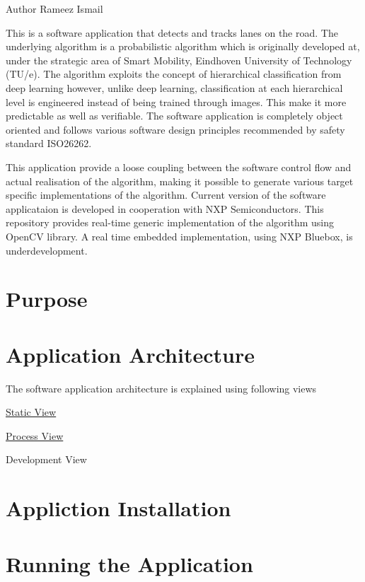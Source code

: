 \begin{DoxyAuthor}{Author}
Rameez Ismail
\end{DoxyAuthor}
This is a software application that detects and tracks lanes on the road. The underlying algorithm is a probabilistic algorithm which is originally developed at, under the strategic area of Smart Mobility, Eindhoven University of Technology (T\-U/e). The algorithm exploits the concept of hierarchical classification from deep learning however, unlike deep learning, classification at each hierarchical level is engineered instead of being trained through images. This make it more predictable as well as verifiable. The software application is completely object oriented and follows various software design principles recommended by safety standard I\-S\-O26262.

This application provide a loose coupling between the software control flow and actual realisation of the algorithm, making it possible to generate various target specific implementations of the algorithm. Current version of the software applicataion is developed in cooperation with N\-X\-P Semiconductors. This repository provides real-\/time generic implementation of the algorithm using Open\-C\-V library. A real time embedded implementation, using N\-X\-P Bluebox, is underdevelopment.\hypertarget{index_Purpose}{}\section{Purpose}\label{index_Purpose}
\hypertarget{index_Architecture}{}\section{Application Architecture}\label{index_Architecture}
The software application architecture is explained using following views
\begin{DoxyItemize}
\item \hyperlink{static}{Static View}
\item \hyperlink{process}{Process View}
\item Development View
\end{DoxyItemize}\hypertarget{index_installing}{}\section{Appliction Installation}\label{index_installing}
\hypertarget{index_running}{}\section{Running the Application}\label{index_running}
